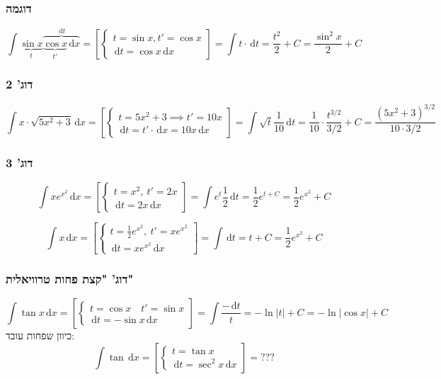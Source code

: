 \documentclass[]{article}
\newcommand\cosx  {\cos x}
\newcommand\sinx  {\sin x}
\newcommand\tanx  {\tan x}
\newcommand\dx    {\,\mathrm{d}x}
\newcommand\dt    {\,\mathrm{d}t}
\newcommand\csb[1]    {\left [ #1 \right ]}
\begin{document}
	\subsubsection{דוגמה}
	\[ \int \underbrace{\sinx}_{t} \overbrace{\underbrace{\cosx}_{t'} \dx}^{\dt} = \csb{\begin{cases}
		t = \sinx, t' = \cosx \\
		\dt = \cosx \dx 
	\end{cases}} = \int t \cdot \dt = \frac{t^2}{2} + C = \frac{\sin^2x}{2} + C \]
	
	\subsubsection{דוג' 2}
	\[ \int x \cdot \sqrt{5x^2 + 3} \dx = \csb{\begin{cases}
			t = 5x^2 + 3 \implies t' = 10x \\
			\dt = t' \cdot \dx = 10x \dx
	\end{cases}} = \int \sqrt{t}\frac{1}{10}\dt = \frac{1}{10} \cdot \frac{t^{3/2}}{3/2} + C = \frac{(5x^2 + 3)^{3/2}}{10 \cdot 3/2} \]
	
	\subsubsection{דוג' 3}
	\[ \int x e^{x^{2}} \dx = \csb{\begin{cases}
			t = x^2, \ t' = 2x \\
			 \dt = 2x \dx
	\end{cases}} = \int e^{t}\frac{1}{2}\dt = \frac{1}{2}e^{t + C} = \frac{1}{2} e^{x^{2}} + C \]
	
	\[ \int x \dx = \csb{\begin{cases}
			t = \frac{1}{2}e^{x^2}, \ t' = xe^{x^2} \\
			\dt = xe^{x^2}\dx
	\end{cases}} = \int \dt = t + C = \frac{1}{2}e^{x^{2}} + C \]

	\subsubsection{דוג' "קצת פחות טרוויאלית"}
	\[ \int \tanx \dx = \csb{\begin{cases}
			t = \cosx \quad t' = \sinx \\
			\dt = -\sinx \dx
	\end{cases}} = \int \frac{-\dt}{t} = - \ln |t| + C = - \ln |\cosx| + C \]
	כיוון שפחות עובד: 
	\[ \int \tan \dx = \csb{\begin{cases}
			t = \tanx \\
			\dt = \sec^2x \dx
	\end{cases}} = ??? \]
\end{document}
